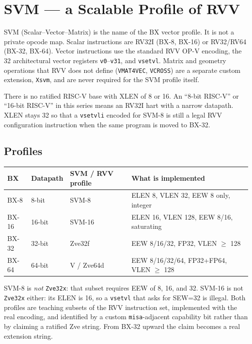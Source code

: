 \documentclass[11pt,a4paper]{article}
\begin{document}
\section{SVM --- a Scalable Profile of RVV}

SVM (Scalar--Vector--Matrix) is the name of the BX vector profile. It is not a private opcode map. Scalar instructions are RV32I (BX-8, BX-16) or RV32/RV64 (BX-32, BX-64). Vector instructions use the standard RVV OP-V encoding, the 32 architectural vector registers \texttt{v0}--\texttt{v31}, and \texttt{vsetvl}. Matrix and geometry operations that RVV does not define (\texttt{VMAT4VEC}, \texttt{VCROSS}) are a separate custom extension, \texttt{Xsvm}, and are never required for the SVM profile itself.

There is no ratified RISC-V base with XLEN of 8 or 16. An ``8-bit RISC-V'' or ``16-bit RISC-V'' in this series means an RV32I hart with a narrow datapath. XLEN stays 32 so that a \texttt{vsetvli} encoded for SVM-8 is still a legal RVV configuration instruction when the same program is moved to BX-32.

\subsection{Profiles}

\begin{center}
\begin{tabular}{@{}llll@{}}
\toprule
\textbf{BX} & \textbf{Datapath} & \textbf{SVM / RVV profile} & \textbf{What is implemented} \\
\midrule
BX-8  & 8-bit  & SVM-8  & ELEN 8, VLEN 32, EEW 8 only, integer \\
BX-16 & 16-bit & SVM-16 & ELEN 16, VLEN 128, EEW 8/16, saturating \\
BX-32 & 32-bit & Zve32f & EEW 8/16/32, FP32, VLEN $\ge$ 128 \\
BX-64 & 64-bit & V / Zve64d & EEW 8/16/32/64, FP32+FP64, VLEN $\ge$ 128 \\
\bottomrule
\end{tabular}
\end{center}

SVM-8 is \emph{not} \texttt{Zve32x}: that subset requires EEW of 8, 16, and 32. SVM-16 is not \texttt{Zve32x} either: its ELEN is 16, so a \texttt{vsetvl} that asks for SEW=32 is illegal. Both profiles are teaching subsets of the RVV instruction set, implemented with the real encoding, and identified by a custom \texttt{misa}-adjacent capability bit rather than by claiming a ratified Zve string. From BX-32 upward the claim becomes a real extension string.
\end{document}
